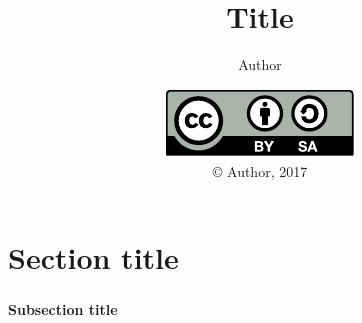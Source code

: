 \documentclass{beamer}
\title{Title}
\author{Author}
\date{\includegraphics{../LicenseLogo}\\\copyright{} Author, 2017}
\newenvironment{namedframe}[1]%
	{\begin{frame}\frametitle{\secname}\framesubtitle{#1}}
	{\end{frame}}
\begin{document}
	\frame{\titlepage}
	\section{Section title}
	\begin{namedframe}{Subsection title}
	\end{namedframe}
\end{document}
